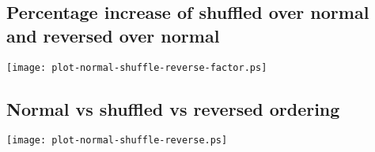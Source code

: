 \documentclass[a4paper,12pt,draft]{article}
\begin{document}
\subsection{Percentage increase of shuffled over normal and reversed over normal}
\label{normal vs shuffled vs reversed ordering factor}
\texttt{[image: plot-normal-shuffle-reverse-factor.ps]}


\subsection{Normal vs shuffled vs reversed ordering}
\label{normal vs shuffled vs reversed ordering}
\texttt{[image: plot-normal-shuffle-reverse.ps]}
\end{document}
